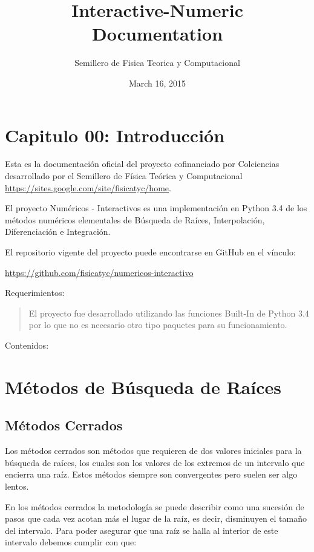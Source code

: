 \documentclass[letterpaper,10pt,oneside]{sphinxmanual}
\title{Interactive-Numeric Documentation}
\date{March 16, 2015}
\author{Semillero de Fisica Teorica y Computacional}
\theoremstyle{plain}%
\theoremstyle{definition}%
\theoremstyle{remark}%
\begin{document}
\maketitle
\tableofcontents
{}\label{index::doc}

\chapter{Capitulo 00: Introducción}
\label{chapter00::doc}\label{chapter00:capitulo-01-interpoladores}


\noindent Esta es la documentación oficial del proyecto cofinanciado por Colciencias desarrollado por el Semillero de Física Teórica y Computacional \href{https://sites.google.com/site/fisicatyc/home}{https://sites.google.com/site/fisicatyc/home}.

El proyecto Numéricos - Interactivos es una implementación en Python 3.4 de los métodos numéricos
elementales de Búsqueda de Raíces, Interpolación, Diferenciación e Integración.

El repositorio vigente del proyecto puede encontrarse en GitHub en el vínculo:

\href{https://github.com/fisicatyc/numericos-interactivo}{https://github.com/fisicatyc/numericos-interactivo}

Requerimientos:
\begin{quote}

El proyecto fue desarrollado utilizando las funciones Built-In de Python 3.4 por lo que no es
necesario otro tipo paquetes para su funcionamiento.
\end{quote}

Contenidos:

\chapter[Búsqueda de Raíces]{Métodos de Búsqueda de Raíces}

\section{Métodos Cerrados}
\noindent Los métodos cerrados son métodos que requieren de dos valores iniciales para la búsqueda de
raíces, los cuales son los valores de los extremos de un intervalo que encierra una raíz. Estos
métodos siempre son convergentes pero suelen ser algo lentos.\medskip

\noindent En los métodos cerrados la metodología se puede describir como una sucesión de pasos que
cada vez acotan más el lugar de la raíz, es decir, disminuyen el tamaño del intervalo. Para
poder asegurar que una raíz se halla al interior de este intervalo debemos cumplir con que:\medskip
\end{document}

